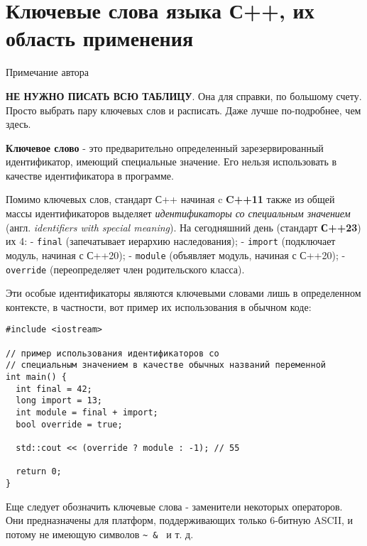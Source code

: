 \section{Ключевые слова языка С++, их область применения}

Примечание автора

\textbf{НЕ НУЖНО ПИСАТЬ ВСЮ ТАБЛИЦУ}. Она для справки, по большому
счету. Просто выбрать пару ключевых слов и расписать. Даже лучше
по-подробнее, чем здесь.

\textbf{Ключевое слово} - это предварительно определенный
зарезервированный идентификатор, имеющий специальные значение. Его
нельзя использовать в качестве идентификатора в программе.

Помимо ключевых слов, стандарт С++ начиная c \textbf{C++11} также из
общей массы идентификаторов выделяет \emph{идентификаторы со специальным
значением} (англ. \emph{identifiers with special meaning}). На
сегодняшний день (стандарт \textbf{С++23}) их 4: - \texttt{final}
(запечатывает иерархию наследования); - \texttt{import} (подключает
модуль, начиная с С++20); - \texttt{module} (объявляет модуль, начиная с
С++20); - \texttt{override} (переопределяет член родительского класса).

Эти особые идентификаторы являются ключевыми словами лишь в определенном
контексте, в частности, вот пример их использования в обычном коде:
\begin{verbatim}
#include <iostream>

// пример использования идентификаторов со
// специальным значением в качестве обычных названий переменной
int main() {
  int final = 42;
  long import = 13;
  int module = final + import;
  bool override = true;

  std::cout << (override ? module : -1); // 55

  return 0;
}
\end{verbatim}

Еще следует обозначить ключевые слова - заменители некоторых операторов.
Они предназначены для платформ, поддерживающих только 6-битную ASCII, и
потому не имеющую символов \texttt{\textasciitilde{}\ \&\ \textbar{}} и
т. д.

